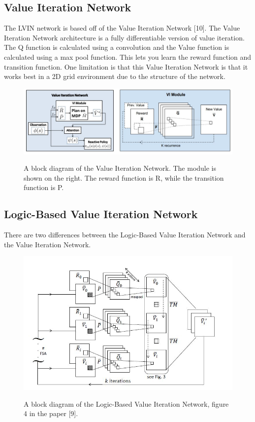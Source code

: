 \documentclass[letterpaper, 10 pt, conference]{ieeeconf}  %
\begin{document}
\subsection{Value Iteration Network} 
The LVIN network is based off of the Value Iteration Network [10]. The Value Iteration Network architecture is a fully differentiable version of value iteration. The Q function is calculated using a convolution and the Value function is calculated using a max pool function. This lets you learn the reward function and transition function. One limitation is that this Value Iteration Network is that it works best in a 2D grid environment due to the structure of the network.
\begin{figure}[h]
 \centering
 \includegraphics[scale=.33]{ValueIterationNetwork.JPG}\\
 \caption{A block diagram of the Value Iteration Network. The module is shown on the right. The reward function is R, while the transition function is P.}
\end{figure}
\newpage
\subsection{Logic-Based Value Iteration Network}
There are two differences between the Logic-Based Value Iteration Network and the Value Iteration Network. 
\begin{figure}[h]
 \centering
 \includegraphics[scale=.5]{LVIN.JPG}\\
 \caption{A block diagram of the Logic-Based Value Iteration Network, figure 4 in the paper [9].}
\end{figure}
\end{document}
